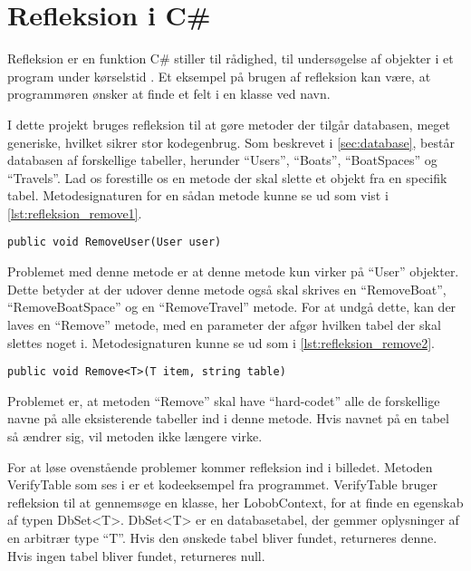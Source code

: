 \section{Refleksion i C#}
\label{sec:refleksion}


Refleksion er en funktion C\# stiller til rådighed, til undersøgelse af objekter i et program under kørselstid \cite{michaelis2012essential}. Et eksempel på brugen af refleksion kan være, at programmøren ønsker at finde et felt i en klasse ved navn.

I dette projekt bruges refleksion til at gøre metoder der tilgår databasen, meget generiske, hvilket sikrer stor kodegenbrug. Som beskrevet i \cref{sec:database}, består databasen af forskellige tabeller, herunder \enquote{Users}, \enquote{Boats}, \enquote{BoatSpaces} og \enquote{Travels}. Lad os forestille os en metode der skal slette et objekt fra en specifik tabel. Metodesignaturen for en sådan metode kunne se ud som vist i \cref{lst:refleksion_remove1}.


\begin{lstlisting}[label=lst:refleksion_remove1]
public void RemoveUser(User user)
\end{lstlisting}

Problemet med denne metode er at denne metode kun virker på \enquote{User} objekter. Dette betyder at der udover denne metode også skal skrives en \enquote{RemoveBoat}, \enquote{RemoveBoatSpace} og en \enquote{RemoveTravel} metode. For at undgå dette, kan der laves en \enquote{Remove} metode, med en parameter der afgør hvilken tabel der skal slettes noget i. Metodesignaturen kunne se ud som i \cref{lst:refleksion_remove2}.


\begin{lstlisting}[label=lst:refleksion_remove2]
public void Remove<T>(T item, string table)
\end{lstlisting}

Problemet er, at metoden \enquote{Remove} skal have \enquote{hard-codet} alle de forskellige navne på alle eksisterende tabeller ind i denne metode. Hvis navnet på en tabel så ændrer sig, vil metoden ikke længere virke.

For at løse ovenstående problemer kommer refleksion ind i billedet. Metoden VerifyTable som ses i  er et kodeeksempel fra programmet. VerifyTable bruger refleksion til at gennemsøge en klasse, her LobobContext, for at finde en egenskab af typen DbSet<T>. DbSet<T> er en databasetabel, der gemmer oplysninger af en arbitrær type \enquote{T}. Hvis den ønskede tabel bliver fundet, returneres denne. Hvis ingen tabel bliver fundet, returneres null.

